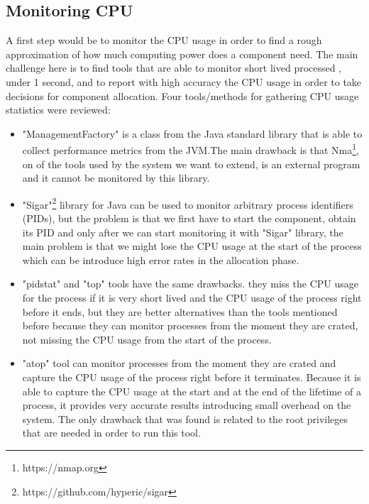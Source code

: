 \subsection{Monitoring CPU}
A first step would be to monitor the CPU usage in order to find a rough approximation of how much computing power does a component need. The main challenge here is to find tools that are able to monitor short lived processed , under 1 second, and to report with high accuracy the CPU usage in order to take decisions for component allocation. Four tools/methods for gathering CPU usage statistics were reviewed:  
\begin{itemize}
	\item "ManagementFactory" is a class from the Java standard library that is able to collect performance metrics from the JVM.The main drawback is that Nma\footnote{https://nmap.org}, on of the tools used by the system we want to extend, is an external program and it cannot be monitored by this library.
	\item "Sigar"\footnote{https://github.com/hyperic/sigar} library for Java can be used to monitor arbitrary process identifiers (PIDs), but the problem is that we first have to start the component, obtain its PID and only after we can start monitoring it with "Sigar" library, the main problem is that we might lose the CPU usage at the start of the process which can be introduce high error rates in the allocation phase.
	\item "pidstat" and "top" tools have the same drawbacks. they miss the CPU usage for the process if it is very short lived and the CPU usage of the process right before it ends, but they are better alternatives than the tools mentioned before because they can monitor processes from the moment they are crated, not missing the CPU usage from the start of the process.
	\item "atop" tool can monitor processes from the moment they are crated and capture the CPU usage of the process right before it terminates. Because it is able to capture the CPU usage at the start and at the end of the lifetime of a process, it provides very accurate results introducing small overhead on the system. The only drawback that was found is related to the root privileges that are needed in order to run this tool.
\end{itemize}
 
